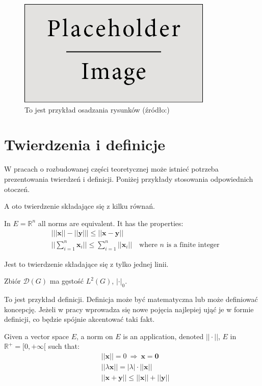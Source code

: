 \begin{figure}[!ht]
    \centering
    \includegraphics[scale=0.6]{Pictures/placeholder.jpg}
    \caption{To jest przykład osadzania rysunków (źródło:)}
    \label{fig:rys1}
\end{figure}


\section{Twierdzenia i definicje}

W pracach o rozbudowanej części teoretycznej może istnieć potrzeba prezentowania twierdzeń i definicji. Poniżej przykłady stosowania odpowiednich otoczeń.

A oto twierdzenie składające się z kilku równań.

\begin{theorem}
    In $E=\mathbb{R}^n$ all norms are equivalent. It has the properties:
    \begin{align}
        & \big| ||\mathbf{x}|| - ||\mathbf{y}|| \big|\leq || \mathbf{x}- \mathbf{y}||\\
        &  ||\sum_{i=1}^n\mathbf{x}_i||\leq \sum_{i=1}^n||\mathbf{x}_i||\quad\text{where $n$ is a finite integer}
    \end{align}
\end{theorem}

Jest to twierdzenie składające się z tylko jednej linii.

\begin{theorem}
    Zbiór $\mathcal{D}(G)$ ma gęstość $L^2(G)$, $|\cdot|_0$.
\end{theorem}


To jest przykład definicji. Definicja może być matematyczna lub może definiować koncepcję. Jeżeli w pracy wprowadza się nowe pojęcia najlepiej ująć je w formie definicji, co będzie spójnie akcentować taki fakt.

\begin{definition}
    Given a vector space $E$, a norm on $E$ is an application, denoted $||\cdot||$, $E$ in $\mathbb{R}^+=[0,+\infty[$ such that:
    \begin{align}
        & ||\mathbf{x}||=0\ \Rightarrow\ \mathbf{x}=\mathbf{0}\\
        & ||\lambda \mathbf{x}||=|\lambda|\cdot ||\mathbf{x}||\\
        & ||\mathbf{x}+\mathbf{y}||\leq ||\mathbf{x}||+||\mathbf{y}||
    \end{align}
\end{definition}


